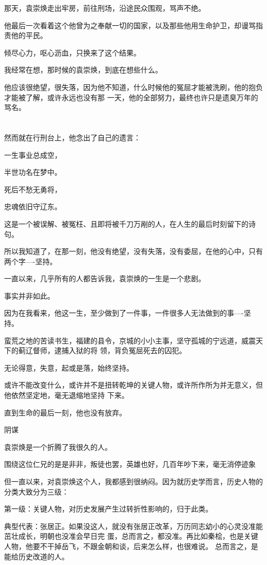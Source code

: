 \documentclass[11pt,a4paper,onecolumn]{article}
\begin{document}
那天，袁崇焕走出牢房，前往刑场，沿途民众围观，骂声不绝。

他最后一次看着这个他曾为之奉献一切的国家，以及那些他用生命护卫，却谩骂指责他的平民。

倾尽心力，呕心沥血，只换来了这个结果。

我经常在想，那时候的袁崇焕，到底在想些什么。

他应该很绝望，很失落，因为他不知道，什么时候他的冤屈才能被洗刷，他的抱负才能被了解，或许永远也没有那
一天，他的全部努力，最终也许只是遗臭万年的骂名。

\section[\thesection]{}

然而就在行刑台上，他念出了自己的遗言：

一生事业总成空，

半世功名在梦中。

死后不愁无勇将，

忠魂依旧守辽东。

这是一个被误解、被冤枉、且即将被千刀万剐的人，在人生的最后时刻留下的诗句。

所以我知道了，在那一刻，他没有绝望，没有失落，没有委屈，在他的心中，只有两个字----坚持。

一直以来，几乎所有的人都告诉我，袁崇焕的一生是一个悲剧。

事实并非如此。

因为在我看来，他这一生，至少做到了一件事，一件很多人无法做到的事----坚持。

蛮荒之地的苦读书生，福建的县令，京城的小小主事，坚守孤城的宁远道，威震天下的蓟辽督师，逮捕入狱的将
领，背负冤屈死去的囚犯。

无论得意，失意，起或是落，始终坚持。

或许不能改变什么，或许并不是扭转乾坤的关键人物，或许所作所为并无意义，但他依然坚定地，毫无退缩地坚持
下来。

直到生命的最后一刻，他也没有放弃。

阴谋

袁崇焕是一个折腾了我很久的人。

围绕这位仁兄的是是非非，叛徒也罢，英雄也好，几百年吵下来，毫无消停迹象

但一直以来，对袁崇焕这个人，我都感到很纳闷。因为就历史学而言，历史人物的分类大致分为三级：

第一级：关键人物，对历史发展产生过转折性影响的，归于此类。

典型代表：张居正。如果没这人，就没有张居正改革，万历同志幼小的心灵没准能茁壮成长，明朝也没准会早日完
蛋，总而言之，都没准。再比如秦桧，也是关键人物，他要不干掉岳飞，不跟金朝和谈，后来怎么样，也很难说。
总而言之，是能给历史改道的人。
\end{document}
